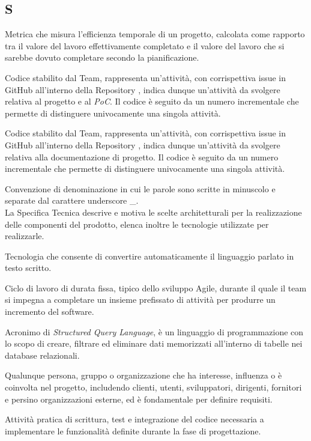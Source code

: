 \begin{center}
\section*{S}
\end{center}

Metrica che misura l'efficienza temporale di un progetto, calcolata come rapporto tra il valore del lavoro effettivamente completato e il valore del lavoro che si sarebbe dovuto completare secondo la pianificazione.

Codice stabilito dal Team, rappresenta un'attività, con corrispettiva issue in GitHub all'interno della Repository , indica dunque un'attività da svolgere relativa al progetto e al \textit{PoC}. Il codice è seguito da un numero incrementale che permette di distinguere univocamente una singola attività.

Codice stabilito dal Team, rappresenta un'attività, con corrispettiva issue in GitHub all'interno della Repository , indica dunque un'attività da svolgere relativa alla documentazione di progetto. Il codice è seguito da un numero incrementale che permette di distinguere univocamente una singola attività.

Convenzione di denominazione in cui le parole sono scritte in minuscolo e separate dal carattere underscore \_.\\

La Specifica Tecnica descrive e motiva le scelte architetturali per la realizzazione delle componenti del prodotto, elenca inoltre le tecnologie utilizzate per realizzarle.

Tecnologia che consente di convertire automaticamente il linguaggio parlato in testo scritto.

Ciclo di lavoro di durata fissa, tipico dello sviluppo Agile, durante il quale il team si impegna a completare un insieme prefissato di attività per produrre un incremento del software.

Acronimo di \textit{Structured Query Language}, è un linguaggio di programmazione con lo scopo di creare, filtrare ed eliminare dati memorizzati all'interno di tabelle nei database relazionali.

Qualunque persona, gruppo o organizzazione che ha interesse, influenza o è coinvolta nel progetto, includendo clienti, utenti, sviluppatori, dirigenti, fornitori e persino organizzazioni esterne, ed è fondamentale per definire requisiti.

Attività pratica di scrittura, test e integrazione del codice necessaria a implementare le funzionalità definite durante la fase di progettazione.


